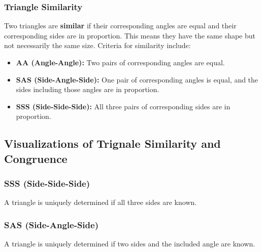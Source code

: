 \subsubsection{Triangle Similarity}
Two triangles are \textbf{similar} if their corresponding angles are equal and their corresponding sides are in proportion. This means they have the same shape but not necessarily the same size. Criteria for similarity include:

\begin{itemize}[label=\(-\)]
    \item \textbf{AA (Angle-Angle):} Two pairs of corresponding angles are equal.
    \item \textbf{SAS (Side-Angle-Side):} One pair of corresponding angles is equal, and the sides including those angles are in proportion.
    \item \textbf{SSS (Side-Side-Side):} All three pairs of corresponding sides are in proportion.
\end{itemize}

\subsection{Visualizations of Trignale Similarity and Congruence}
\subsubsection{SSS (Side-Side-Side)}
A triangle is uniquely determined if all three sides are known.
\begin{center}
\end{center}

\subsubsection{SAS (Side-Angle-Side)}
A triangle is uniquely determined if two sides and the included angle are known.
\begin{center}
\end{center}

